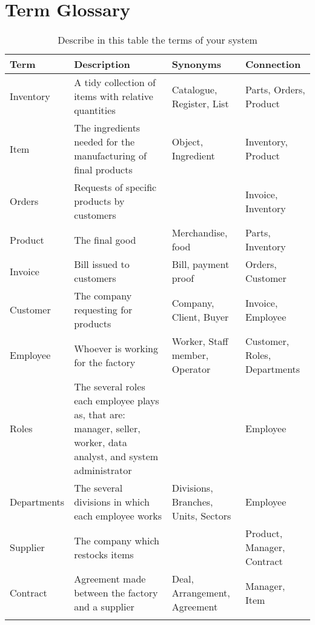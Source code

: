 \section{Term Glossary}




%

\begin{longtable}{|p{}|p{} |p{}|p{}|} 
\hline
\textbf{Term} & \textbf{Description} & \textbf{Synonyms} & \textbf{Connection} \\\hline
Inventory & A tidy collection of items with relative quantities & Catalogue, Register, List &  Parts, Orders, Product \\\hline
Item & The ingredients needed for the manufacturing of final products & Object, Ingredient & Inventory, Product\\\hline
Orders & Requests of specific products by customers & & Invoice, Inventory\\\hline
Product & The final good & Merchandise, food & Parts, Inventory\\\hline
Invoice & Bill issued to customers & Bill, payment proof & Orders, Customer\\\hline
Customer & The company requesting for products & Company, Client, Buyer & Invoice, Employee\\\hline
Employee & Whoever is working for the factory & Worker, Staff member, Operator & Customer, Roles, Departments\\\hline
Roles & The several roles each employee plays as, that are: manager, seller, worker, data analyst, and system administrator & & Employee\\\hline
Departments & The several divisions in which each employee works & Divisions, Branches, Units, Sectors & Employee\\\hline
Supplier & The company which restocks items & & Product, Manager, Contract\\\hline
Contract & Agreement made between the factory and a supplier & Deal, Arrangement, Agreement & Manager, Item\\\hline

\caption{Describe in this table the terms of your system}
\label{tab:termGlossary}
\end{longtable}